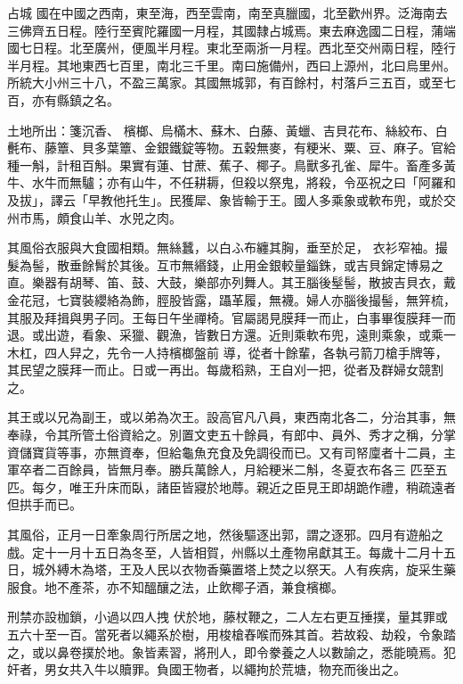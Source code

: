 
\begin{pinyinscope}

 占城
 國在中國之西南，東至海，西至雲南，南至真臘國，北至歡州界。泛海南去三佛齊五日程。陸行至賓陀羅國一月程，其國隸占城焉。東去麻逸國二日程，蒲端國七日程。北至廣州，便風半月程。東北至兩浙一月程。西北至交州兩日程，陸行半月程。其地東西七百里，南北三千里。南曰施備州，西曰上源州，北曰烏里州。所統大小州三十八，不盈三萬家。其國無城郭，有百餘村，村落戶三五百，或至七百，亦有縣鎮之名。



 土地所出：箋沉香、
 檳榔、烏樠木、蘇木、白藤、黃蠟、吉貝花布、絲絞布、白㲲布、藤簟、貝多葉簟、金銀鐵錠等物。五穀無麥，有粳米、粟、豆、麻子。官給種一斛，計租百斛。果實有蓮、甘蔗、蕉子、椰子。鳥獸多孔雀、犀牛。畜產多黃牛、水牛而無驢；亦有山牛，不任耕耨，但殺以祭鬼，將殺，令巫祝之曰「阿羅和及拔」，譯云「早教他托生」。民獲犀、象皆輸于王。國人多乘象或軟布兜，或於交州市馬，頗食山羊、水兕之肉。



 其風俗衣服與大食國相類。無絲蠶，以白ふ布纏其胸，垂至於足，
 衣衫窄袖。撮髮為髻，散垂餘髾於其後。互市無緡錢，止用金銀較量錙銖，或吉貝錦定博易之直。樂器有胡琴、笛、鼓、大鼓，樂部亦列舞人。其王腦後髽髻，散披吉貝衣，戴金花冠，七寶裝纓絡為飾，脛股皆露，躡革履，無襪。婦人亦腦後撮髻，無笄梳，其服及拜揖與男子同。王每日午坐禪椅。官屬謁見膜拜一而止，白事畢復膜拜一而退。或出遊，看象、采獵、觀漁，皆數日方還。近則乘軟布兜，遠則乘象，或乘一木杠，四人舁之，先令一人持檳榔盤前
 導，從者十餘輩，各執弓箭刀槍手牌等，其民望之膜拜一而止。日或一再出。每歲稻熟，王自刈一把，從者及群婦女競割之。



 其王或以兄為副王，或以弟為次王。設高官凡八員，東西南北各二，分治其事，無奉祿，令其所管土俗資給之。別置文吏五十餘員，有郎中、員外、秀才之稱，分掌資儲寶貨等事，亦無資奉，但給龜魚充食及免調役而已。又有司帑廩者十二員，主軍卒者二百餘員，皆無月奉。勝兵萬餘人，月給粳米二斛，冬夏衣布各三
 匹至五匹。每夕，唯王升床而臥，諸臣皆寢於地蓐。親近之臣見王即胡跪作禮，稍疏遠者但拱手而已。



 其風俗，正月一日牽象周行所居之地，然後驅逐出郭，謂之逐邪。四月有遊船之戲。定十一月十五日為冬至，人皆相賀，州縣以土產物帛獻其王。每歲十二月十五日，城外縛木為塔，王及人民以衣物香藥置塔上焚之以祭天。人有疾病，旋采生藥服食。地不產茶，亦不知醞釀之法，止飲椰子酒，兼食檳榔。



 刑禁亦設枷鎖，小過以四人拽
 伏於地，藤杖鞭之，二人左右更互捶撲，量其罪或五六十至一百。當死者以繩系於樹，用梭槍舂喉而殊其首。若故殺、劫殺，令象踏之，或以鼻卷撲於地。象皆素習，將刑人，即令豢養之人以數諭之，悉能曉焉。犯奸者，男女共入牛以贖罪。負國王物者，以繩拘於荒塘，物充而後出之。




\end{pinyinscope}
